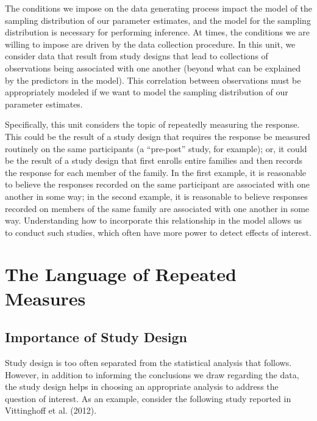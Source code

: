\documentclass[
  letterpaper,
  DIV=11,
  numbers=noendperiod]{scrreprt}
\theoremstyle{definition}
\theoremstyle{definition}
\theoremstyle{remark}
\begin{document}
The conditions we impose on the data generating process impact the model
of the sampling distribution of our parameter estimates, and the model
for the sampling distribution is necessary for performing inference. At
times, the conditions we are willing to impose are driven by the data
collection procedure. In this unit, we consider data that result from
study designs that lead to collections of observations being associated
with one another (beyond what can be explained by the predictors in the
model). This correlation between observations must be appropriately
modeled if we want to model the sampling distribution of our parameter
estimates.

Specifically, this unit considers the topic of repeatedly measuring the
response. This could be the result of a study design that requires the
response be measured routinely on the same participants (a ``pre-post''
study, for example); or, it could be the result of a study design that
first enrolls entire families and then records the response for each
member of the family. In the first example, it is reasonable to believe
the responses recorded on the same participant are associated with one
another in some way; in the second example, it is reasonable to believe
responses recorded on members of the same family are associated with one
another in some way. Understanding how to incorporate this relationship
in the model allows us to conduct such studies, which often have more
power to detect effects of interest.

\hypertarget{sec-rm-terminology}{%
\chapter{The Language of Repeated Measures}\label{sec-rm-terminology}}

\providecommand{\norm}[1]{\lVert#1\rVert}
\providecommand{\abs}[1]{\lvert#1\rvert}
\providecommand{\dist}[1]{\stackrel{\text{#1}}{\sim}}
\providecommand{\ind}[1]{\mathbb{I}\left(#1\right)}
\providecommand{\bm}[1]{\mathbf{#1}}
\providecommand{\bs}[1]{\boldsymbol{#1}}
\providecommand{\Ell}{\mathcal{L}}
\providecommand{\indep}{\perp\negthickspace\negmedspace\perp}

\hypertarget{importance-of-study-design}{%
\section{Importance of Study Design}\label{importance-of-study-design}}

Study design is too often separated from the statistical analysis that
follows. However, in addition to informing the conclusions we draw
regarding the data, the study design helps in choosing an appropriate
analysis to address the question of interest. As an example, consider
the following study reported in Vittinghoff et al. (2012).
\end{document}
